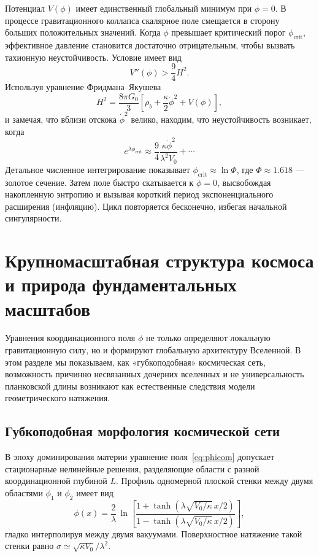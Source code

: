 \documentclass[12pt,a4paper]{article}
\begin{document}
	Потенциал \(V(\phi)\) имеет единственный глобальный минимум при \(\phi=0\). В процессе гравитационного коллапса скалярное поле смещается в сторону больших положительных значений. Когда \(\phi\) превышает критический порог \(\phi_{\mathrm{crit}}\), эффективное давление становится достаточно отрицательным, чтобы вызвать тахионную неустойчивость. Условие имеет вид
	\[
	V''(\phi) > \frac{9}{4} H^2.
	\]
	Используя уравнение Фридмана–Якушева
	\[
	H^2 = \frac{8\pi G_0}{3} \left[ \rho_b + \frac{\kappa}{2}\dot\phi^2 + V(\phi) \right],
	\]
	и замечая, что вблизи отскока \(\dot\phi^2\) велико, находим, что неустойчивость возникает, когда
	\[
	e^{\lambda\phi_{\mathrm{crit}}} \approx \frac{9}{4} \frac{\kappa\dot\phi^2}{\lambda^2 V_0} + \cdots
	\]
	Детальное численное интегрирование показывает \(\phi_{\mathrm{crit}} \approx \ln\Phi\), где \(\Phi \approx 1.618\) — золотое сечение. Затем поле быстро скатывается к \(\phi=0\), высвобождая накопленную энтропию и вызывая короткий период экспоненциального расширения (инфляцию). Цикл повторяется бесконечно, избегая начальной сингулярности.
	
	\section{Крупномасштабная структура космоса и природа фундаментальных масштабов}
	\label{sec:sponge}
	
	Уравнения координационного поля \(\phi\) не только определяют локальную гравитационную силу, но и формируют глобальную архитектуру Вселенной. В этом разделе мы показываем, как «губкоподобная» космическая сеть, возможность причинно несвязанных дочерних вселенных и не универсальность планковской длины возникают как естественные следствия модели геометрического натяжения.
	
	\subsection{Губкоподобная морфология космической сети}
	В эпоху доминирования материи уравнение поля~\eqref{eq:phieom} допускает стационарные нелинейные решения, разделяющие области с разной координационной глубиной \(L\). Профиль одномерной плоской стенки между двумя областями \(\phi_1\) и \(\phi_2\) имеет вид
	\begin{equation}
		\phi(x) = \frac{2}{\lambda}\,\ln\!\left[
		\frac{1 + \tanh(\lambda\sqrt{V_0/\kappa}\, x/2)}
		{1 - \tanh(\lambda\sqrt{V_0/\kappa}\, x/2)}
		\right],
		\label{eq:domain-wall}
	\end{equation}
	гладко интерполируя между двумя вакуумами. Поверхностное натяжение такой стенки равно \(\sigma \simeq \sqrt{\kappa V_0}/\lambda^2\).
	
\end{document}
